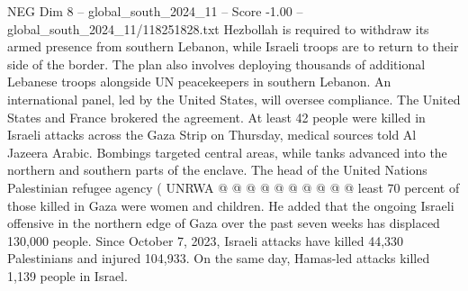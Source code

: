 \begin{textsample}{NEG Dim 8 – global\_south\_2024\_11 – Score -1.00 – global\_south\_2024\_11/118251828.txt}
Hezbollah is required to withdraw its armed presence from southern Lebanon, while Israeli troops are to return to their side of the border.
The plan also involves deploying thousands of additional Lebanese troops alongside UN peacekeepers in southern Lebanon.
An international panel, led by the United States, will oversee compliance.
The United States and France brokered the agreement.
At least 42 people were killed in Israeli attacks across the Gaza Strip on Thursday, medical sources told Al Jazeera Arabic.
Bombings targeted central areas, while tanks advanced into the northern and southern parts of the enclave.
The head of the United Nations Palestinian refugee agency ( UNRWA @ @ @ @ @ @ @ @ @ @ least 70 percent of those killed in Gaza were women and children.
He added that the ongoing Israeli offensive in the northern edge of Gaza over the past seven weeks has displaced 130,000 people.
Since October 7, 2023, Israeli attacks have killed 44,330 Palestinians and injured 104,933.
On the same day, Hamas-led attacks killed 1,139 people in Israel.

\end{textsample}
